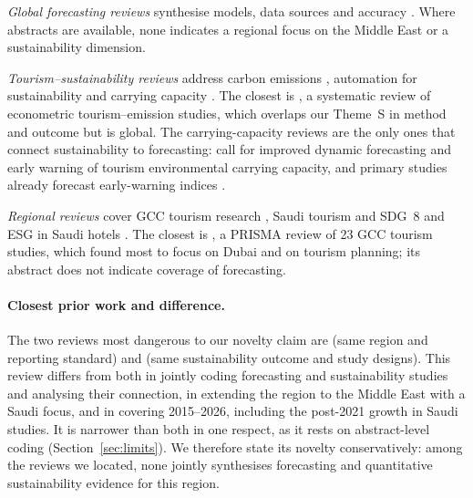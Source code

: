 \documentclass[11pt,a4paper]{article}
\begin{document}
\emph{Global forecasting reviews} synthesise models, data sources and accuracy \citep{Peng2014,Jiao2019,Song2019,Zhang2020km,Dowlut2023,Wu2024,Henriques2024}. Where abstracts are available, none indicates a regional focus on the Middle East or a sustainability dimension.

\emph{Tourism--sustainability reviews} address carbon emissions \citep{Sun2022}, automation for sustainability \citep{Majid2023} and carrying capacity \citep{Long2022,Ajuhari2023}. The closest is \citet{Sun2022}, a systematic review of econometric tourism--emission studies, which overlaps our Theme~S in method and outcome but is global. The carrying-capacity reviews are the only ones that connect sustainability to forecasting: \citet{Long2022} call for improved dynamic forecasting and early warning of tourism environmental carrying capacity, and primary studies already forecast early-warning indices \citep[e.g.][]{Ye2020}.

\emph{Regional reviews} cover GCC tourism research \citep{Saleh2021}, Saudi tourism and SDG~8 \citep{Saudi2024sdg} and ESG in Saudi hotels \citep{Alhejaili2025}. The closest is \citet{Saleh2021}, a PRISMA review of 23 GCC tourism studies, which found most to focus on Dubai and on tourism planning; its abstract does not indicate coverage of forecasting.

\paragraph{Closest prior work and difference.} The two reviews most dangerous to our novelty claim are \citet{Saleh2021} (same region and reporting standard) and \citet{Sun2022} (same sustainability outcome and study designs). This review differs from both in jointly coding forecasting and sustainability studies and analysing their connection, in extending the region to the Middle East with a Saudi focus, and in covering 2015--2026, including the post-2021 growth in Saudi studies. It is narrower than both in one respect, as it rests on abstract-level coding (Section~\ref{sec:limits}). We therefore state its novelty conservatively: among the reviews we located, none jointly synthesises forecasting and quantitative sustainability evidence for this region.
\end{document}
